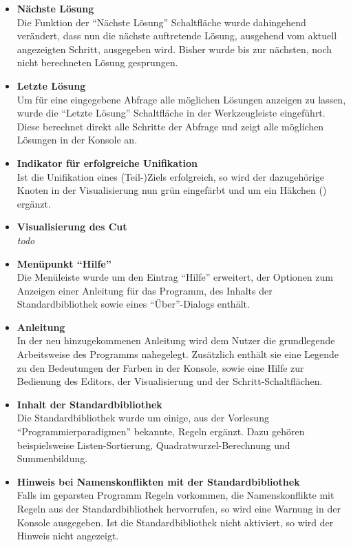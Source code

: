 \documentclass[parskip=full,11pt,twoside]{scrartcl}
\begin{document}
\begin{itemize}
  \item \textbf{Nächste Lösung}\\
        Die Funktion der \enquote{Nächste Lösung} Schaltfläche wurde dahingehend verändert, dass nun die nächste auftretende Lösung, ausgehend vom aktuell angezeigten Schritt, ausgegeben wird. Bisher wurde bis zur nächsten, noch nicht berechneten Lösung gesprungen.
  \item \textbf{Letzte Lösung}\\
        Um für eine eingegebene Abfrage alle möglichen Lösungen anzeigen zu lassen, wurde die \enquote{Letzte Lösung} Schaltfläche in der Werkzeugleiste eingeführt. Diese berechnet direkt alle Schritte der Abfrage und zeigt alle möglichen Lösungen in der Konsole an.
  \item \textbf{Indikator für erfolgreiche Unifikation}\\
        Ist die Unifikation eines (Teil-)Ziels erfolgreich, so wird der dazugehörige Knoten in der Visualisierung nun grün eingefärbt und um ein Häkchen () ergänzt.
  \item \textbf{Visualisierung des Cut}\\
        \textit{todo}
  \item \textbf{Menüpunkt \enquote{Hilfe}}\\
        Die Menüleiste wurde um den Eintrag \enquote{Hilfe} erweitert, der Optionen zum Anzeigen einer Anleitung für das Programm, des Inhalts der Standardbibliothek sowie eines \enquote{Über}-Dialogs enthält.
  \item \textbf{Anleitung}\\
        In der neu hinzugekommenen Anleitung wird dem Nutzer die grundlegende Arbeitsweise des Programms nahegelegt. Zusätzlich enthält sie eine Legende zu den Bedeutungen der Farben in der Konsole, sowie eine Hilfe zur Bedienung des Editors, der Visualisierung und der Schritt-Schaltflächen.
  \item \textbf{Inhalt der Standardbibliothek}\\
        Die Standardbibliothek wurde um einige, aus der Vorlesung \enquote{Programmierparadigmen} bekannte, Regeln ergänzt. Dazu gehören beispielsweise Listen-Sortierung, Quadratwurzel-Berechnung und Summenbildung.
  \item \textbf{Hinweis bei Namenskonflikten mit der Standardbibliothek}\\
        Falls im geparsten Programm Regeln vorkommen, die Namenskonflikte mit Regeln aus der Standardbibliothek hervorrufen, so wird eine Warnung in der Konsole ausgegeben. Ist die Standardbibliothek nicht aktiviert, so wird der Hinweis nicht angezeigt.

\end{itemize}
\end{document}
